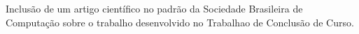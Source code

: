 

%
%

\chapter{}


Inclusão de um artigo científico no padrão da Sociedade Brasileira de Computação sobre o trabalho desenvolvido
no Trabalhao de Conclusão de Curso.



